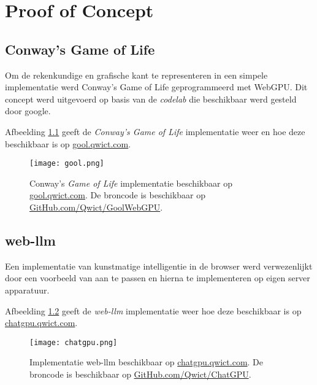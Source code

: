 \chapter{Proof of Concept}
\label{ch:poc}

\section{Conway's Game of Life}

Om de rekenkundige en grafische kant te representeren in een simpele implementatie werd Conway's Game of Life geprogrammeerd met WebGPU. Dit concept werd uitgevoerd op basis van de \textit{codelab} die beschikbaar werd gesteld door google. \autocite{google2023, Qwict2024}

Afbeelding \ref{fig:Conway's Game of Life} geeft de \textit{Conway's Game of Life} implementatie weer en hoe deze beschikbaar is op \href{https://gool.qwict.com}{gool.qwict.com}.

\bigbreak{}

\begin{figure}
    \texttt{[image: gool.png]}
    \caption[Conway's \textit{Game of Life} implementatie  \autocite{Qwict2024}]{
        Conway's \textit{Game of Life} implementatie beschikbaar op \href{https://gool.qwict.com}{gool.qwict.com}. De broncode is beschikbaar op \href{https://github.com/qwict/GoolWebGPU}{GitHub.com/Qwict/GoolWebGPU}.
    }
    \label{fig:Conway's Game of Life}
\end{figure}

\section{web-llm}

Een implementatie van kunstmatige intelligentie in de browser werd verwezenlijkt door een voorbeeld van \textcite{mlcai2023} aan te passen en hierna te implementeren op eigen server apparatuur. \autocite{Qwict2024a}

\bigbreak{}

Afbeelding \ref{fig:Implementatie web-llm} geeft de \textit{web-llm} implementatie weer hoe deze beschikbaar is op \href{https://chatgpu.qwict.com}{chatgpu.qwict.com}. \autocite{Qwict2024a}

\begin{figure}
    \texttt{[image: chatgpu.png]}
    \caption[Implementatie web-llm \autocite{Qwict2024a}]{
        Implementatie web-llm beschikbaar op \href{https://chatgpu.qwict.com}{chatgpu.qwict.com}. De broncode is beschikbaar op \href{https://github.com/qwict/chatgpu}{GitHub.com/Qwict/ChatGPU}. \autocite{Qwict2024a}
    }
    \label{fig:Implementatie web-llm}
\end{figure}